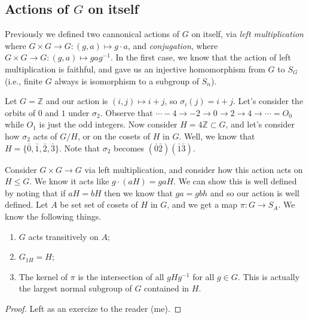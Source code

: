 \subsection{Actions of \texorpdfstring{$G$}{G} on itself}

Previously we defined two cannonical actions of $G$ on itself, via \emph{left multiplication} where $G \times G \to G : (g,a) \mapsto g\cdot a$, and \emph{conjugation}, where $G \times G \to G : (g,a) \mapsto gag^{-1}$. In the first case, we know that the action of left multiplication is faithful, and gave us an injective homomorphism from $G$ to $S_G$ (i.e., finite $G$ always is isomorphism to a subgroup of $S_n$).

\begin{example}
Let $G = \mathbb{Z}$ and our action is $(i,j) \mapsto i+j$, so $\sigma_i(j) = i+j$. Let's consider the orbits of $0$ and $1$ under $\sigma_2$. Observe that $\cdots -4 \to -2 \to 0 \to 2 \to 4 \to \cdots = O_0$ while $O_1$ is just the odd integers. Now consider $H = 4\mathbb{Z} \subset G$, and let's consider  how $\sigma_2$ acts of $G/H$, or on the cosets of $H$ in $G$. Well, we know that $H = \{\bar{0}, \bar{1},\bar{2},\bar{3}\}$. Note that $\sigma_2$ becomes $(\bar{0}\bar{2})(\bar{1}\bar{3})$.
\end{example}

\begin{theorem}
Consider $G \times G \to G$ via left multiplication, and consider how this action acts on $H \leq G$. We know it acts like $g \cdot (aH) = gaH$. We can show this is well defined by noting that if $aH = bH$ then we know that $ga = gbh$ and so our action is well defined. Let $A$ be set set of cosets of $H$ in $G$, and we get a map $\pi : G \to S_A$. We know the following things.
\begin{enumerate}
\item $G$ acts transitively on $A$;
\item $G_{1H} = H$;
\item The kernel of $\pi$ is the intersection of all $gHg^{-1}$ for all $g \in G$. This is actually the largest normal subgroup of $G$ contained in $H$.
\end{enumerate}
\end{theorem}

\begin{proof}
Left as an exercize to the reader (me).
\end{proof}